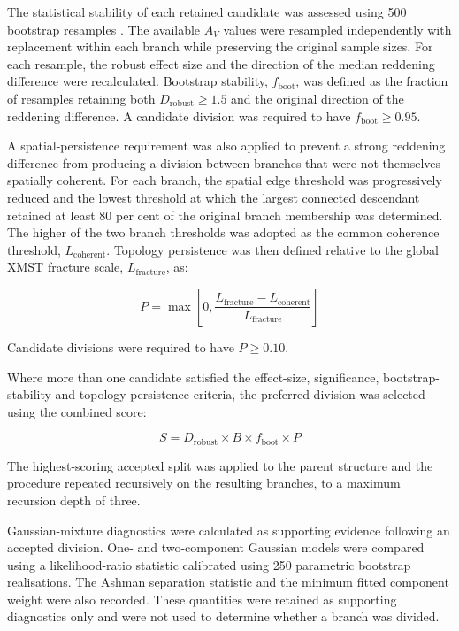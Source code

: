 \documentclass[fleqn,usenatbib]{mnras}
\begin{document}
The statistical stability of each retained candidate was assessed using 500 bootstrap resamples \citep{Efron1979}. The available $A_V$ values were resampled independently with replacement within each branch while preserving the original sample sizes. For each resample, the robust effect size and the direction of the median reddening difference were recalculated. Bootstrap stability, $f_{\mathrm{boot}}$, was defined as the fraction of resamples retaining both $D_{\mathrm{robust}} \ge 1.5$ and the original direction of the reddening difference. A candidate division was required to have $f_{\mathrm{boot}} \ge 0.95$.

A spatial-persistence requirement was also applied to prevent a strong reddening difference from producing a division between branches that were not themselves spatially coherent. For each branch, the spatial edge threshold was progressively reduced and the lowest threshold at which the largest connected descendant retained at least 80 per cent of the original branch membership was determined. The higher of the two branch thresholds was adopted as the common coherence threshold, $L_{\mathrm{coherent}}$. Topology persistence was then defined relative to the global XMST fracture scale, $L_{\mathrm{fracture}}$, as:

\begin{equation}
P = \max\left[ 0, \frac{L_{\mathrm{fracture}} - L_{\mathrm{coherent}}}{L_{\mathrm{fracture}}} \right]
\end{equation}

Candidate divisions were required to have $P \ge 0.10$.


Where more than one candidate satisfied the effect-size, significance, bootstrap-stability and topology-persistence criteria, the preferred division was selected using the combined score:

\begin{equation}
S = D_{\mathrm{robust}} \times B \times f_{\mathrm{boot}} \times P
\end{equation}

The highest-scoring accepted split was applied to the parent structure and the procedure repeated recursively on the resulting branches, to a maximum recursion depth of three.

Gaussian-mixture diagnostics were calculated as supporting evidence following an accepted division. One- and two-component Gaussian models were compared using a likelihood-ratio statistic calibrated using 250 parametric bootstrap realisations. The Ashman separation statistic \citep{Ashman1994} and the minimum fitted component weight were also recorded. These quantities were retained as supporting diagnostics only and were not used to determine whether a branch was divided.
\end{document}
